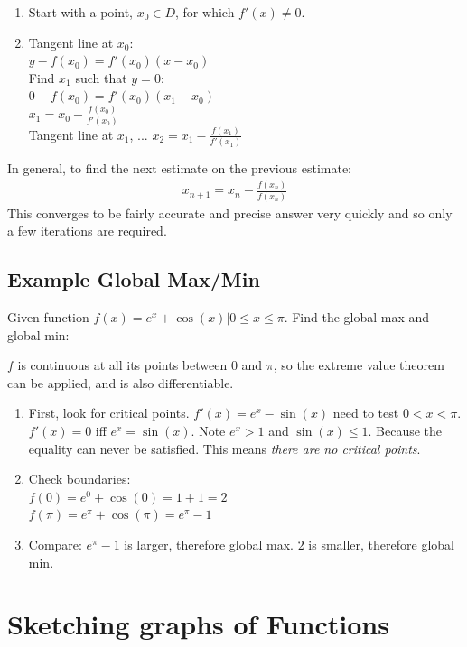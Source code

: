 \begin{enumerate}
  \item Start with a point, $x_0 \in D$, for which $f'(x) \neq 0$.
  \item Tangent line at $x_0$: \\
  $y - f(x_0) = f'(x_0)(x-x_0)$ \\
  Find $x_1$ such that $y=0$: \\
  $0-f(x_0) = f'(x_0)(x_1 - x_0)$ \\
  $x_1 = x_0 - \frac{f(x_0)}{f'(x_0)}$ \\
  Tangent line at $x_1$, ...
  $x_2 = x_1 - \frac{f(x_1)}{f'(x_1)}$ \\
\end{enumerate}
In general, to find the next estimate on the previous estimate:
\begin{align}
  x_{n+1} = x_n - \frac{f(x_n)}{f(x_n)}
\end{align}
This converges to be fairly accurate and precise answer very quickly
and so only a few iterations are required.

\subsection{Example Global Max/Min}
Given function $f(x) = e^x+\cos(x) | 0 \leq x \leq \pi$.
Find the global max and global min:

$f$ is continuous at all its points between 0 and $\pi$, so the extreme value
theorem can be applied, and is also differentiable.

\begin{enumerate}
  \item First, look for critical points.
  $f'(x) = e^x - \sin(x)$ need to test $ 0 < x < \pi$.
  $f'(x) = 0$ iff $e^x = \sin(x)$. Note $e^x > 1$ and $\sin(x) \leq 1$. Because
  the equality can never be satisfied. This means \emph{there are no critical
  points}.
  \item Check boundaries: \\
  $f(0) = e^0 + \cos(0) = 1 + 1 = 2$ \\
  $f(\pi) = e^\pi + \cos(\pi) = e^\pi - 1$ \\
  \item Compare:
  $e^\pi -1$ is larger, therefore global max.
  $2$ is smaller, therefore global min.
\end{enumerate}

\section{Sketching graphs of Functions}


